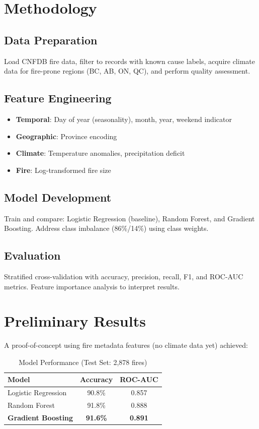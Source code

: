 \documentclass[sigconf,nonacm]{acmart}
\begin{document}
\section{Methodology}

\subsection{Data Preparation}
Load CNFDB fire data, filter to records with known cause labels, acquire climate data for fire-prone regions (BC, AB, ON, QC), and perform quality assessment.

\subsection{Feature Engineering}
\begin{itemize}
    \item \textbf{Temporal}: Day of year (seasonality), month, year, weekend indicator
    \item \textbf{Geographic}: Province encoding
    \item \textbf{Climate}: Temperature anomalies, precipitation deficit
    \item \textbf{Fire}: Log-transformed fire size
\end{itemize}

\subsection{Model Development}
Train and compare: Logistic Regression (baseline), Random Forest, and Gradient Boosting. Address class imbalance (86\%/14\%) using class weights.

\subsection{Evaluation}
Stratified cross-validation with accuracy, precision, recall, F1, and ROC-AUC metrics. Feature importance analysis to interpret results.

\section{Preliminary Results}

A proof-of-concept using fire metadata features (no climate data yet) achieved:

\begin{table}[h]
\small
\centering
\caption{Model Performance (Test Set: 2,878 fires)}
\begin{tabular}{lcc}
\toprule
\textbf{Model} & \textbf{Accuracy} & \textbf{ROC-AUC} \\
\midrule
Logistic Regression & 90.8\% & 0.857 \\
Random Forest & 91.8\% & 0.888 \\
\textbf{Gradient Boosting} & \textbf{91.6\%} & \textbf{0.891} \\
\bottomrule
\end{tabular}
\end{table}
\end{document}
